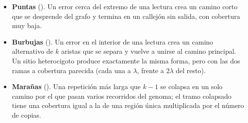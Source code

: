 \begin{itemize}
  \item \textbf{Puntas} (). Un error cerca del extremo de una lectura crea un camino corto que se desprende del grafo y termina en un callejón sin salida, con cobertura muy baja.
  \item \textbf{Burbujas} (). Un error en el interior de una lectura crea un camino alternativo de $k$ aristas que se separa y vuelve a unirse al camino principal. Un sitio heterocigoto produce exactamente la misma forma, pero con las dos ramas a cobertura parecida (cada una a $\lambda$, frente a $2\lambda$ del resto).
  \item \textbf{Marañas} (). Una repetición más larga que $k-1$ se colapsa en un solo camino por el que pasan varios recorridos del genoma; el tramo colapsado tiene una cobertura igual a la de una región única multiplicada por el número de copias.
\end{itemize}

